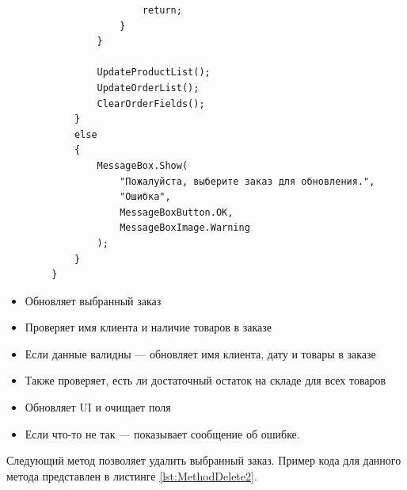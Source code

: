 \documentclass[12pt]{article}
\begin{document}
\begin{lstlisting}
                        return;
                    }
                }

                UpdateProductList();
                UpdateOrderList();
                ClearOrderFields();
            }
            else
            {
                MessageBox.Show(
                    "Пожалуйста, выберите заказ для обновления.", 
                    "Ошибка", 
                    MessageBoxButton.OK, 
                    MessageBoxImage.Warning
                );
            }
        }
\end{lstlisting}

\begin{itemize}
	\item Обновляет выбранный заказ
	\item Проверяет имя клиента и наличие товаров в заказе
	\item Если данные валидны — обновляет имя клиента, дату и товары в заказе
	\item Также проверяет, есть ли достаточный остаток на складе для всех товаров
	\item Обновляет UI и очищает поля
	\item Если что-то не так — показывает сообщение об ошибке.
\end{itemize}

\pagebreak

Следующий метод позволяет удалить выбранный заказ. Пример кода для данного метода представлен в листинге \ref{lst:MethodDelete2}.
\end{document}
